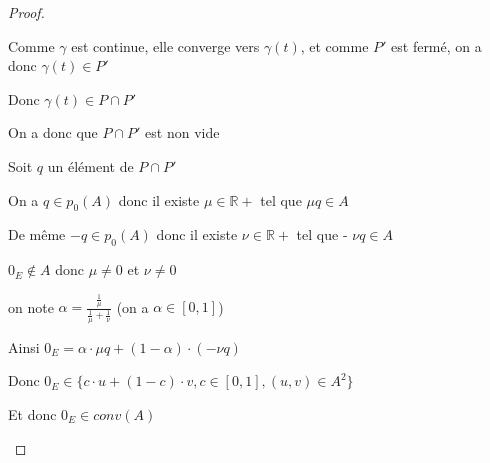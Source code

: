 \documentclass[a4paper]{article}
\begin{document}
\begin{proof}
\begin{itemize}
\begin{itemize}
Comme $\gamma$ est continue, elle converge vers $\gamma(t)$, et comme $P'$ est fermé, on a donc $\gamma(t) \in P'$

Donc $\gamma(t) \in P \cap P'$
\end{itemize}

On a donc que $P \cap P'$ est non vide

\bigskip

Soit $q$ un élément de $P \cap P'$

On a $q \in p_{0}(A)$ donc il existe $\mu \in \mathbb{R}+$ tel que $\mu q \in A$

De même $-q \in p_{0}(A)$ donc il existe $\nu \in \mathbb{R}+$ tel que - $\nu q \in A$

$0_{E} \notin A$ donc $\mu \neq 0$ et $\nu \neq 0$

on note $\alpha = \frac{\frac{1}{\mu}}{\frac{1}{\mu} + \frac{1}{\nu}}$ (on a $\alpha \in [0, 1]$)

Ainsi $0_{E} = \alpha \cdot \mu q + (1 - \alpha) \cdot (- \nu  q)$

Donc $0_{E} \in \{c \cdot u + (1 - c) \cdot v, c \in [0, 1], (u, v) \in A^{2} \}$


Et donc $0_{E} \in conv(A)$
\end{itemize}
\end{proof}
\end{document}
